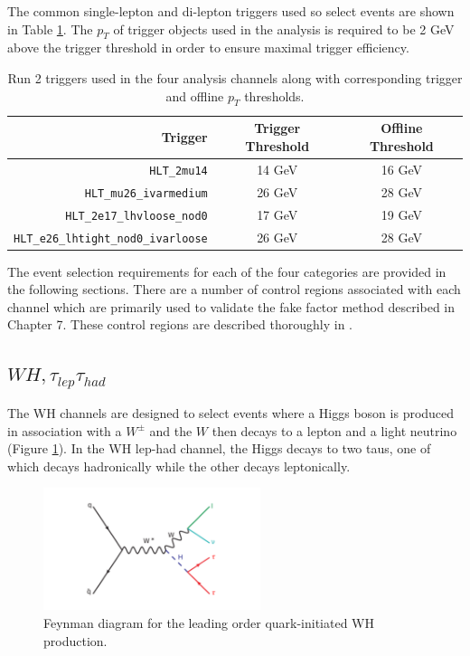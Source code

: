 The common single-lepton and di-lepton triggers used so select events are shown in Table \ref{tab:triggers}. The $p_T$ of trigger objects used in the analysis is required to be 2 GeV above the trigger threshold in order to ensure maximal trigger efficiency.\\

\begin{table}[htb!]
\centering
   \begin{tabular}{r|c|c} %
      \hline
      Trigger & Trigger Threshold & Offline Threshold\\
      \hline
\verb!HLT_2mu14! & 14 GeV & 16 GeV \\
\verb!HLT_mu26_ivarmedium! & 26 GeV & 28 GeV \\
\verb!HLT_2e17_lhvloose_nod0! & 17 GeV & 19 GeV \\ 
\verb!HLT_e26_lhtight_nod0_ivarloose!& 26 GeV & 28 GeV \\
      \hline
   \end{tabular}
   \caption{Run 2 triggers used in the four analysis channels along with corresponding trigger and offline $p_T$ thresholds.}
   \label{tab:triggers}
\end{table}

The event selection requirements for each of the four categories are provided in the following sections. There are a number of control regions associated with each channel which are primarily used to validate the fake factor method described in Chapter 7. These control regions are described thoroughly in \cite{vh_run1_paper}.

\subsection{$WH, \tau_{lep}\tau_{had}$}\label{sec:zh_lephad}
The WH channels are designed to select events where a Higgs boson is produced in association with a $W^{\pm}$ and the $W$ then decays to a lepton and a light neutrino (Figure \ref{fig:wh_feyn}). In the WH lep-had channel, the Higgs decays to two taus, one of which decays hadronically while the other decays leptonically.\\

\begin{figure}[htb!]
    \centering
    \includegraphics[width=2.5in]{figures/chapter6/wh_feynman.pdf}
    \caption{Feynman diagram for the leading order quark-initiated WH production.}
    \label{fig:wh_feyn}
\end{figure}

